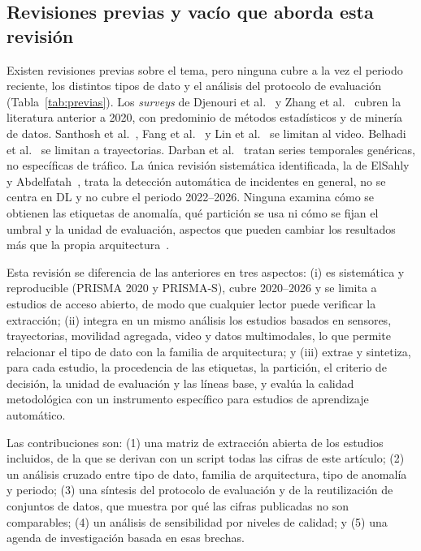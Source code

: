 \documentclass[12pt, a4paper]{article}
\begin{document}
\subsection{Revisiones previas y vacío que aborda esta revisión}
\label{sec:previas}

Existen revisiones previas sobre el tema, pero ninguna cubre a la vez el periodo reciente, los distintos tipos de dato y el análisis del protocolo de evaluación (Tabla~\ref{tab:previas}). Los \textit{surveys} de Djenouri et al.~\cite{djenouri2019survey} y Zhang et al.~\cite{zhang2020urban} cubren la literatura anterior a 2020, con predominio de métodos estadísticos y de minería de datos. Santhosh et al.~\cite{santhosh2020anomaly}, Fang et al.~\cite{fang2024vision} y Lin et al.~\cite{lin2025deep} se limitan al video. Belhadi et al.~\cite{belhadi2020trajectory} se limitan a trayectorias. Darban et al.~\cite{darban2024deep} tratan series temporales genéricas, no específicas de tráfico. La única revisión sistemática identificada, la de ElSahly y Abdelfatah~\cite{elsahly2022systematic}, trata la detección automática de incidentes en general, no se centra en DL y no cubre el periodo 2022--2026. Ninguna examina cómo se obtienen las etiquetas de anomalía, qué partición se usa ni cómo se fijan el umbral y la unidad de evaluación, aspectos que pueden cambiar los resultados más que la propia arquitectura~\cite{darban2024deep}.



Esta revisión se diferencia de las anteriores en tres aspectos: (i) es sistemática y reproducible (PRISMA 2020 y PRISMA-S), cubre 2020--2026 y se limita a estudios de acceso abierto, de modo que cualquier lector puede verificar la extracción; (ii) integra en un mismo análisis los estudios basados en sensores, trayectorias, movilidad agregada, video y datos multimodales, lo que permite relacionar el tipo de dato con la familia de arquitectura; y (iii) extrae y sintetiza, para cada estudio, la procedencia de las etiquetas, la partición, el criterio de decisión, la unidad de evaluación y las líneas base, y evalúa la calidad metodológica con un instrumento específico para estudios de aprendizaje automático.

Las contribuciones son: (1) una matriz de extracción abierta de los \Nestudios{} estudios incluidos, de la que se derivan con un script todas las cifras de este artículo; (2) un análisis cruzado entre tipo de dato, familia de arquitectura, tipo de anomalía y periodo; (3) una síntesis del protocolo de evaluación y de la reutilización de conjuntos de datos, que muestra por qué las cifras publicadas no son comparables; (4) un análisis de sensibilidad por niveles de calidad; y (5) una agenda de investigación basada en esas brechas.
\end{document}
